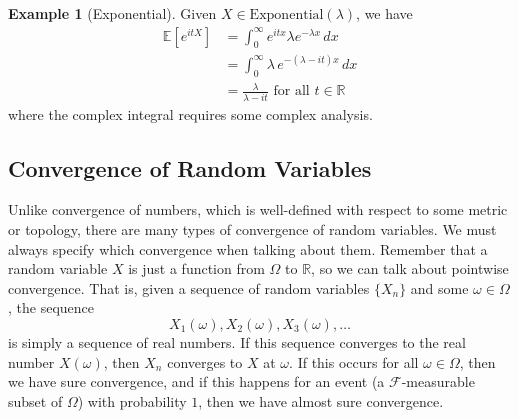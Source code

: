 \documentclass{article}
\theoremstyle{definition}
\newtheorem{example}{Example}[section]
\theoremstyle{remark}
\theoremstyle{definition}
\begin{document}
\begin{example}[Exponential]
Given $X \in \mathrm{Exponential}(\lambda)$, we have 
\begin{align*}
    \mathbb{E}[e^{i t X}] & = \int_0^\infty e^{i t x} \lambda e^{-\lambda x} \,dx \\
    & = \int_0^\infty \lambda \, e^{-(\lambda - i t) x} \,dx \\
    & = \frac{\lambda}{\lambda - it} \text{ for all } t \in \mathbb{R}
\end{align*}
where the complex integral requires some complex analysis. 
\end{example}

\subsection{Convergence of Random Variables}

Unlike convergence of numbers, which is well-defined with respect to some metric or topology, there are many types of convergence of random variables. We must always specify which convergence when talking about them. Remember that a random variable $X$ is just a function from $\Omega$ to $\mathbb{R}$, so we can talk about pointwise convergence. That is, given a sequence of random variables $\{X_n\}$ and some $\omega \in \Omega$, the sequence 
\[X_1(\omega), X_2 (\omega), X_3(\omega), \ldots \]
is simply a sequence of real numbers. If this sequence converges to the real number $X(\omega)$, then $X_n$ converges to $X$ at $\omega$. If this occurs for all $\omega \in \Omega$, then we have sure convergence, and if this happens for an event (a $\mathcal{F}$-measurable subset of $\Omega$) with probability $1$, then we have almost sure convergence. 
\end{document}
